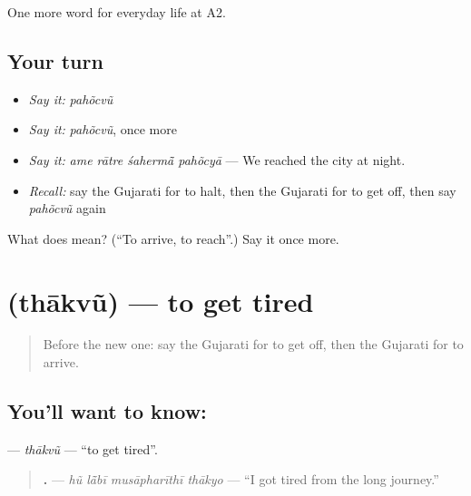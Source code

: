 \begin{grammarlens}[title={What you've built}]
One more word for everyday life at A2.
\end{grammarlens}

\subsection*{Your turn}
\begin{itemize}
\raggedright
  \item \emph{Say it:} \emph{pahõcvũ}
  \item \emph{Say it:} \emph{pahõcvũ}, once more
  \item \emph{Say it:} \emph{ame rātre śahermā̃ pahõcyā} — We reached the city at night.
  \item \emph{Recall:} say the Gujarati for to halt, then the Gujarati for to get off, then say \emph{pahõcvũ} again
\end{itemize}

\begin{tcolorbox}[breakable,colback=teal!4,colframe=teal!35!black,title={Before you move on}]
What does  mean? (\textquotedblleft{}To arrive, to reach\textquotedblright{}.) Say it once more.
\end{tcolorbox}
\section[\texorpdfstring{\gu{થાકવું} (thākvũ)}{થાકવું (thākvũ)}]{ (thākvũ) — to get tired}

\label{lesson:GU-C206-thakvu}



\begin{quote}
Before the new one: say the Gujarati for to get off, then the Gujarati for to arrive.
\end{quote}

\subsection*{You'll want to know: }
\textbf{} — \emph{thākvũ} — \textquotedblleft{}to get tired\textquotedblright{}.

\begin{quote}
\textbf{   .} — \emph{hũ lā̃bī musāpharīthī thākyo} — \textquotedblleft{}I got tired from the long journey.\textquotedblright{}
\end{quote}

